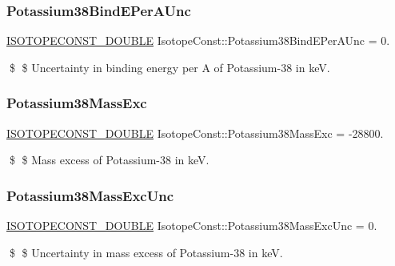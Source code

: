\subsubsection{\texorpdfstring{Potassium38\+Bind\+E\+Per\+A\+Unc}{Potassium38BindEPerAUnc}}
{\footnotesize\ttfamily \mbox{\hyperlink{group___isotope_const-_macros_ga8f45a7272ce02c0b4c65c44636ed719a}{I\+S\+O\+T\+O\+P\+E\+C\+O\+N\+S\+T\+\_\+\+D\+O\+U\+B\+LE}} Isotope\+Const\+::\+Potassium38\+Bind\+E\+Per\+A\+Unc = 0.}

\$ \$ Uncertainty in binding energy per A of Potassium-\/38 in keV. \mbox{\label{group___isotope_const-_potassium-_k38_gadd55fa10b57e469b31ebe65a9653dc12}} 
\subsubsection{\texorpdfstring{Potassium38\+Mass\+Exc}{Potassium38MassExc}}
{\footnotesize\ttfamily \mbox{\hyperlink{group___isotope_const-_macros_ga8f45a7272ce02c0b4c65c44636ed719a}{I\+S\+O\+T\+O\+P\+E\+C\+O\+N\+S\+T\+\_\+\+D\+O\+U\+B\+LE}} Isotope\+Const\+::\+Potassium38\+Mass\+Exc = -\/28800.}

\$ \$ Mass excess of Potassium-\/38 in keV. \mbox{\label{group___isotope_const-_potassium-_k38_gaf2364423083327d39e3b2eb6daadddf0}} 
\subsubsection{\texorpdfstring{Potassium38\+Mass\+Exc\+Unc}{Potassium38MassExcUnc}}
{\footnotesize\ttfamily \mbox{\hyperlink{group___isotope_const-_macros_ga8f45a7272ce02c0b4c65c44636ed719a}{I\+S\+O\+T\+O\+P\+E\+C\+O\+N\+S\+T\+\_\+\+D\+O\+U\+B\+LE}} Isotope\+Const\+::\+Potassium38\+Mass\+Exc\+Unc = 0.}

\$ \$ Uncertainty in mass excess of Potassium-\/38 in keV. \mbox{\label{group___isotope_const-_potassium-_k38_ga20525e9ff4021c64c6def533ea2b3036}} 
